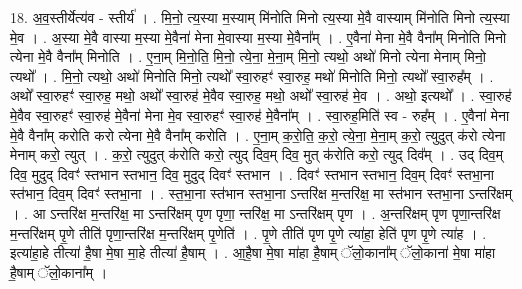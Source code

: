\documentclass[17pt]{extarticle}
\begin{document}
18. अ॒व॒स्तीर्येत्य॑व - स्तीर्य॑ । . मि॒नो॒ त्य॒स्या म॒स्याम् मि॑नोति मिनो त्य॒स्या मे॒वै वास्याम् मि॑नोति मिनो त्य॒स्या मे॒व । . अ॒स्या मे॒वै वास्या म॒स्या मे॒वैना॑ मेना मे॒वास्या म॒स्या मे॒वैना᳚म् । . ए॒वैना॑ मेना मे॒वै वैना᳚म् मिनोति मिनो त्येना मे॒वै वैना᳚म् मिनोति । . ए॒ना॒म् मि॒नो॒ति॒ मि॒नो॒ त्ये॒ना॒ मे॒ना॒म् मि॒नो॒ त्यथो॒ अथो॑ मिनो त्येना मेनाम् मिनो॒ त्यथो᳚ । . मि॒नो॒ त्यथो॒ अथो॑ मिनोति मिनो॒ त्यथो᳚ स्वा॒रुहꣳ॑ स्वा॒रुह॒ मथो॑ मिनोति मिनो॒ त्यथो᳚ स्वा॒रुह᳚म् । . अथो᳚ स्वा॒रुहꣳ॑ स्वा॒रुह॒ मथो॒ अथो᳚ स्वा॒रुह॑ मे॒वैव स्वा॒रुह॒ मथो॒ अथो᳚ स्वा॒रुह॑ मे॒व । . अथो॒ इत्यथो᳚ । . स्वा॒रुह॑ मे॒वैव स्वा॒रुहꣳ॑ स्वा॒रुह॑ मे॒वैना॑ मेना मे॒व स्वा॒रुहꣳ॑ स्वा॒रुह॑ मे॒वैना᳚म् । . स्वा॒रुह॒मिति॑ स्व - रुह᳚म् । . ए॒वैना॑ मेना मे॒वै वैना᳚म् करोति करो त्येना मे॒वै वैना᳚म् करोति । . ए॒ना॒म् क॒रो॒ति॒ क॒रो॒ त्ये॒ना॒ मे॒ना॒म् क॒रो॒ त्युदुत् क॑रो त्येना मेनाम् करो॒ त्युत् । . क॒रो॒ त्युदुत् क॑रोति करो॒ त्युद् दिव॒म् दिव॒ मुत् क॑रोति करो॒ त्युद् दिव᳚म् । . उद् दिव॒म् दिव॒ मुदुद् दिवꣳ॑ स्तभान स्तभान॒ दिव॒ मुदुद् दिवꣳ॑ स्तभान । . दिवꣳ॑ स्तभान स्तभान॒ दिव॒म् दिवꣳ॑ स्तभा॒ना स्त॑भान॒ दिव॒म् दिवꣳ॑ स्तभा॒ना । . स्त॒भा॒ना स्त॑भान स्तभा॒ना ऽन्तरि॑क्ष म॒न्तरि॑क्ष॒ मा स्त॑भान स्तभा॒ना ऽन्तरि॑क्षम् । . आ ऽन्तरि॑क्ष म॒न्तरि॑क्ष॒ मा ऽन्तरि॑क्षम् पृण पृणा॒ न्तरि॑क्ष॒ मा ऽन्तरि॑क्षम् पृण । . अ॒न्तरि॑क्षम् पृण पृणा॒न्तरि॑क्ष म॒न्तरि॑क्षम् पृ॒णे तीति॑ पृणा॒न्तरि॑क्ष म॒न्तरि॑क्षम् पृ॒णेति॑ । . पृ॒णे तीति॑ पृण पृ॒णे त्या॑हा॒ हेति॑ पृण पृ॒णे त्या॑ह । . इत्या॑हा॒हे तीत्या॑ है॒षा मे॒षा मा॒हे तीत्या॑ है॒षाम् । . आ॒है॒षा मे॒षा मा॑हा है॒षाम् ॅलो॒काना᳚म् ॅलो॒काना॑ मे॒षा मा॑हा है॒षाम् ॅलो॒काना᳚म् । \newline
\end{document}

